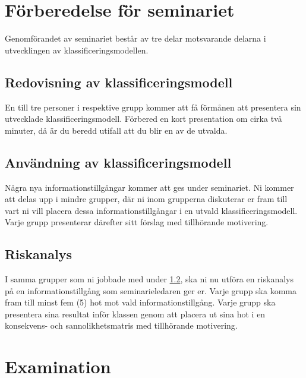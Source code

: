 \documentclass[a4paper]{llncs}
\begin{document}
\section{Förberedelse för seminariet}

Genomförandet av seminariet består av tre delar motsvarande delarna 
i utvecklingen av klassificeringsmodellen.

\subsection{Redovisning av klassificeringsmodell}
\label{sec:present}

En till tre personer i respektive grupp kommer att få förmånen att presentera 
sin utvecklade klassificeringsmodell.
Förbered en kort presentation om cirka två minuter, då är du beredd utifall att 
du blir en av de utvalda.

\subsection{Användning av klassificeringsmodell}
\label{sec:use}

Några nya informationstillgångar kommer att ges under seminariet.
Ni kommer att delas upp i mindre grupper, där ni inom grupperna diskuterar er 
fram till vart ni vill placera dessa informationstillgångar i en utvald 
klassificeringsmodell.
Varje grupp presenterar därefter sitt förslag med tillhörande motivering.

\subsection{Riskanalys}
\label{sec:risk}

I samma grupper som ni jobbade med under \cref{sec:use}, ska ni nu utföra en 
riskanalys på en informationstillgång som seminarieledaren ger er.
Varje grupp ska komma fram till minst fem (5) hot mot vald 
informationstillgång.
Varje grupp ska presentera sina resultat inför klassen genom att placera ut 
sina hot i en konsekvens- och sannolikhetsmatris med tillhörande motivering.


\section{Examination}
\label{sec:examination}
\end{document}
